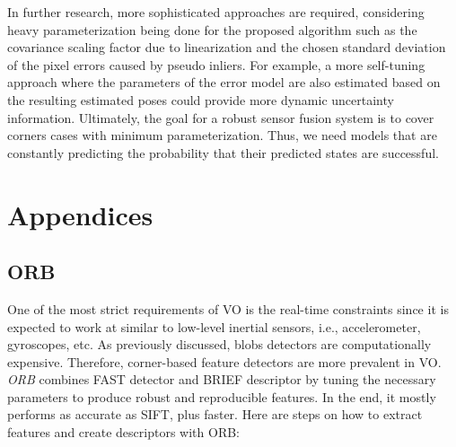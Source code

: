 \documentclass[a4paper]{report}
\numberwithin{figure}{section}
\begin{document}
In further research, more sophisticated approaches are required, considering
heavy parameterization being done for the proposed algorithm such as the covariance
scaling factor due to linearization and the chosen standard deviation of the
pixel errors caused by pseudo inliers. For example, a more self-tuning approach
where the parameters of the error model are also estimated based on the
resulting estimated poses could provide more dynamic uncertainty information.
Ultimately, the goal for a robust sensor fusion system is to cover
corners cases with minimum parameterization.  Thus, we need models that are
constantly predicting the probability that their predicted states are
successful.





\appendix

\renewcommand{\thechapter}{A\arabic{chapter}}

\chapter{Appendices} \label{cp_appendices}


\section{ORB} \label{sb_sc_orb}

One of the most strict requirements of VO is the real-time constraints since 
it is expected to work at similar to low-level inertial sensors, i.e., 
accelerometer, gyroscopes, etc.  As previously discussed, blobs detectors are 
computationally expensive. Therefore, corner-based feature detectors are more 
prevalent in VO.  \textit{ORB} \parencite{Rublee2011a} combines FAST detector 
\parencite{Rosten2006} and BRIEF descriptor \parencite{M.2010} by tuning the 
necessary 
parameters to produce robust and reproducible features.  In the end, it mostly 
performs as accurate as SIFT, plus faster. Here are steps on how to extract 
features and create descriptors with ORB: 
\end{document}

